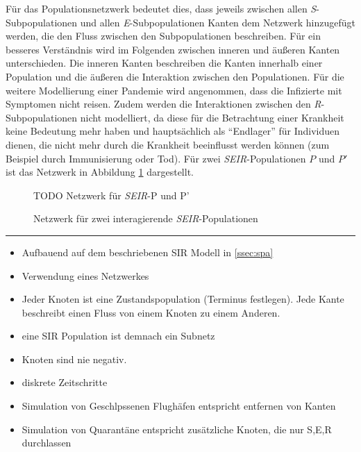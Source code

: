 Für das Populationsnetzwerk bedeutet dies, dass jeweils zwischen allen \emph{S}-Subpopulationen und allen \emph{E}-Subpopulationen Kanten dem Netzwerk hinzugefügt werden, die den Fluss zwischen den Subpopulationen beschreiben. Für ein besseres Verständnis wird im Folgenden zwischen inneren und äußeren Kanten unterschieden. Die inneren Kanten beschreiben die Kanten innerhalb einer Population und die äußeren die Interaktion zwischen den Populationen. Für die weitere Modellierung einer Pandemie wird angenommen, dass die Infizierte mit Symptomen nicht reisen. Zudem werden die Interaktionen zwischen den \emph{R}-Subpopulationen nicht modelliert, da diese für die Betrachtung einer Krankheit keine Bedeutung mehr haben und hauptsächlich als ``Endlager'' für Individuen dienen, die nicht mehr durch die Krankheit beeinflusst werden können (zum Beispiel durch Immunisierung oder Tod). Für zwei \emph{SEIR}-Populationen $P$ und $P'$ ist das Netzwerk in Abbildung \ref{fig:ssec:multiPop:2interactingSEIR} dargestellt.

\begin{figure}
TODO Netzwerk für \emph{SEIR}-P und P'
\caption{Netzwerk für zwei interagierende \emph{SEIR}-Populationen}\label{fig:ssec:multiPop:2interactingSEIR}
\end{figure}



\hrule
\begin{itemize}
	\item Aufbauend auf dem beschriebenen SIR Modell in \ref{ssec:spa}
	\item Verwendung eines Netzwerkes
	\item Jeder Knoten ist eine Zustandspopulation (Terminus festlegen). Jede Kante beschreibt einen Fluss von einem Knoten zu einem Anderen.
	\item eine SIR Population ist demnach ein Subnetz
	\item Knoten sind nie negativ. 
	\item diskrete Zeitschritte
	\item Simulation von Geschlpssenen Flughäfen entspricht entfernen von Kanten
	\item Simulation von Quarantäne entspricht zusätzliche Knoten, die nur S,E,R durchlassen
\end{itemize}